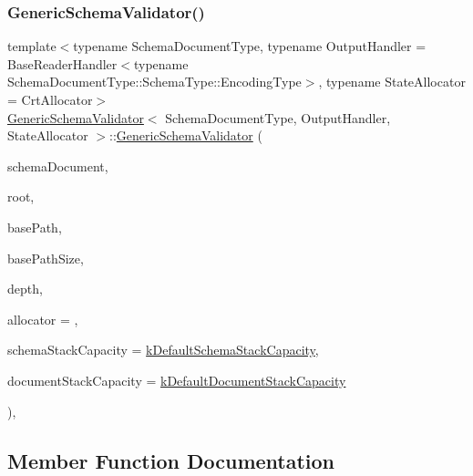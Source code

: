 \subsubsection{\texorpdfstring{Generic\+Schema\+Validator()}{GenericSchemaValidator()}\hspace{0.1cm}{\footnotesize\ttfamily [3/3]}}
{\footnotesize\ttfamily template$<$typename Schema\+Document\+Type, typename Output\+Handler = Base\+Reader\+Handler$<$typename Schema\+Document\+Type\+::\+Schema\+Type\+::\+Encoding\+Type$>$, typename State\+Allocator = Crt\+Allocator$>$ \\
\hyperlink{classGenericSchemaValidator}{Generic\+Schema\+Validator}$<$ Schema\+Document\+Type, Output\+Handler, State\+Allocator $>$\+::\hyperlink{classGenericSchemaValidator}{Generic\+Schema\+Validator} (\begin{DoxyParamCaption}\item[{const Schema\+Document\+Type \&}]{schema\+Document,  }\item[{const \hyperlink{classGenericSchemaValidator_ac79628f00f6720bbabb70b44f0d076a0}{Schema\+Type} \&}]{root,  }\item[{const char $\ast$}]{base\+Path,  }\item[{size\+\_\+t}]{base\+Path\+Size,  }\item[{unsigned}]{depth,  }\item[{State\+Allocator $\ast$}]{allocator = {},  }\item[{size\+\_\+t}]{schema\+Stack\+Capacity = {\ttfamily \hyperlink{classGenericSchemaValidator_aab8510602779c91bc5b55ea81fd7385b}{k\+Default\+Schema\+Stack\+Capacity}},  }\item[{size\+\_\+t}]{document\+Stack\+Capacity = {\ttfamily \hyperlink{classGenericSchemaValidator_a0052a86778575179422064167a95c405}{k\+Default\+Document\+Stack\+Capacity}} }\end{DoxyParamCaption})\hspace{0.3cm}{\ttfamily [inline]}, {\ttfamily [private]}}



\subsection{Member Function Documentation}
\mbox{\label{classGenericSchemaValidator_a4c9c7db8a3488f84a5a86681ad1d8194}} 
